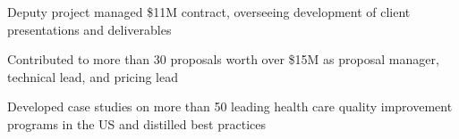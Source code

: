 \begin{cventries}
{\begin{cvitems}
\item Deputy project managed \$11M contract, overseeing development of client presentations and deliverables
\item Contributed to more than 30 proposals worth over \$15M as proposal manager, technical lead, and pricing lead
\item Developed case studies on more than 50 leading health care quality improvement programs in the US and distilled best practices
\end{cvitems}}
\end{cventries}
